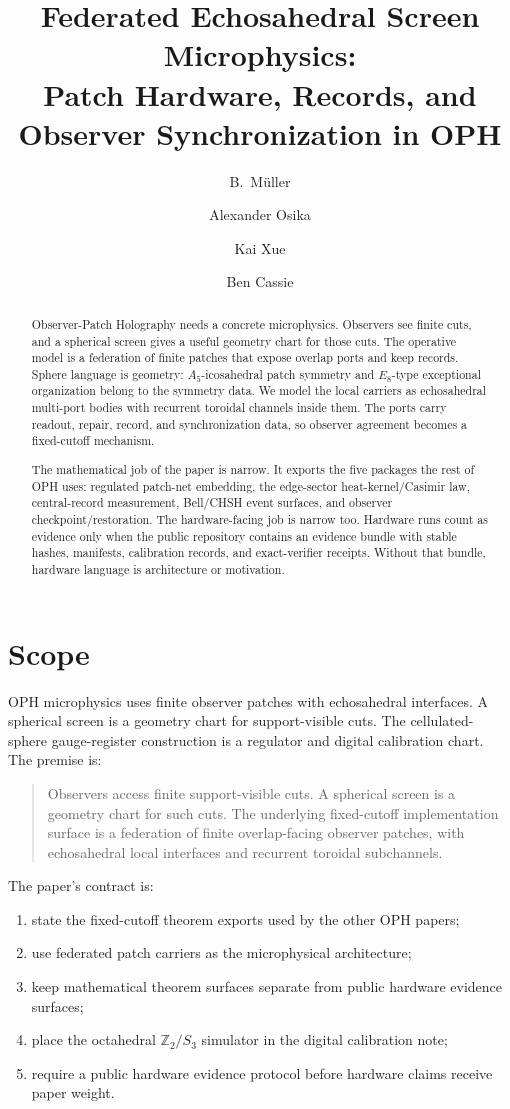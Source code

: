 \documentclass[11pt]{article}
\title{Federated Echosahedral Screen Microphysics:\\
Patch Hardware, Records, and Observer Synchronization in OPH}
\author{B.\ M\"uller \and Alexander Osika \and Kai Xue \and Ben Cassie}
\date{\OPHPaperReleaseDate}
\theoremstyle{remark}
\theoremstyle{plain}
\begin{document}
\maketitle
\OPHPaperReleaseBanner

\begin{abstract}
Observer-Patch Holography needs a concrete microphysics. Observers see finite cuts, and a
spherical screen gives a useful geometry chart for those cuts. The operative model is a
federation of finite patches that expose overlap ports and keep records. Sphere language is
geometry: \(A_5\)-icosahedral patch symmetry and \(E_8\)-type exceptional organization belong to
the symmetry data. We model the local carriers as echosahedral multi-port bodies with recurrent
toroidal channels inside them. The ports carry readout, repair, record, and synchronization data,
so observer agreement becomes a fixed-cutoff mechanism.

The mathematical job of the paper is narrow. It exports the five packages the rest
of OPH uses: regulated patch-net embedding, the edge-sector heat-kernel/Casimir law,
central-record measurement, Bell/CHSH event surfaces, and observer checkpoint/restoration. The
hardware-facing job is narrow too. Hardware runs count as evidence only when the public
repository contains an evidence bundle with stable hashes, manifests, calibration records, and
exact-verifier receipts. Without that bundle, hardware language is architecture or motivation.
\end{abstract}

\tableofcontents
\newpage

\section{Scope}

OPH microphysics uses finite observer patches with echosahedral interfaces. A spherical screen is
a geometry chart for support-visible cuts. The cellulated-sphere gauge-register construction is a
regulator and digital calibration chart. The premise is:
\begin{quote}
Observers access finite support-visible cuts. A spherical screen is a geometry chart for such
cuts. The underlying fixed-cutoff implementation surface is a federation of finite
overlap-facing observer patches, with echosahedral local interfaces and recurrent toroidal
subchannels.
\end{quote}

The paper's contract is:
\begin{enumerate}[leftmargin=2em]
\item state the fixed-cutoff theorem exports used by the other OPH papers;
\item use federated patch carriers as the microphysical architecture;
\item keep mathematical theorem surfaces separate from public hardware evidence surfaces;
\item place the octahedral \(\mathbb Z_2/S_3\) simulator in the digital calibration note;
\item require a public hardware evidence protocol before hardware claims receive paper
weight.
\end{enumerate}
\end{document}

